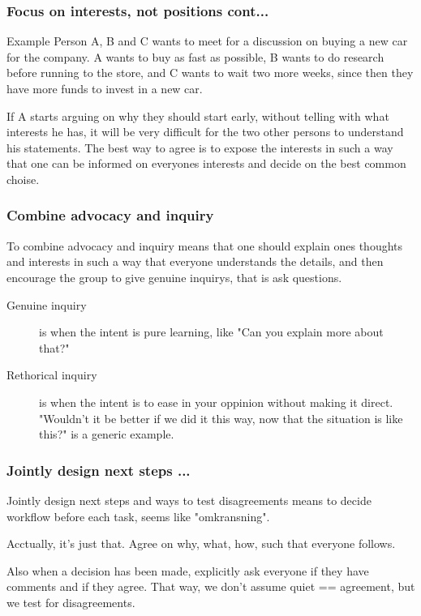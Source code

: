 \documentclass[screen]{beamer}
\begin{document}
\begin{frame}
    \frametitle{Focus on interests, not positions cont...}


   \begin{block}{Example}
        Person A, B and C wants to meet for a discussion on buying a new car for the company. A wants to buy as fast as possible,
        B wants to do research before running to the store, and C wants to wait two more weeks, since then they have more funds to
        invest in a new car.

If A starts arguing on why they should start early, without telling with what interests he has, it will
        be very difficult for the two other persons to understand his statements. The best way to agree is to expose the interests in
        such a way that one can be informed on everyones interests and decide on the best common choise.
    \end{block}   

\end{frame}
\begin{frame}
    \frametitle{Combine advocacy and inquiry}

    To combine advocacy and inquiry means that one should explain ones thoughts and interests in such a way that everyone understands
    the details, and then encourage the group to give genuine inquirys, that is ask questions.

    \begin{description}
        \item[Genuine inquiry] is when the intent is pure learning, like "Can you explain more about that?"
        \item[Rethorical inquiry] is when the intent is to ease in your oppinion without making it direct.
        "Wouldn't it be better if we did it this way, now that the situation is like this?" is a generic example.
    \end{description}

\end{frame}

\begin{frame}
    \frametitle{Jointly design next steps ...}

Jointly design next steps and ways to test disagreements means to decide workflow before each task, seems like "omkransning".

Acctually, it's just that. Agree on why, what, how, such that everyone follows.

Also when a decision has been made, explicitly
ask everyone if they have comments and if they agree. That way, we don't assume quiet == agreement, but we test for disagreements.

\end{frame}
\end{document}
